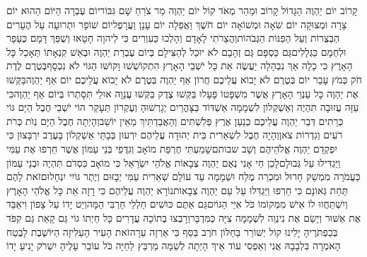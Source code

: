 \documentclass[../main/main.tex]{subfiles}
\begin{document}
\begin{multicols*}{\ncols}
\PreVerseSpace{}קָרוֹב יוֹם יַהְוֶה הַגָּדוֹל קָרוֹב וּמַהֵר מְאֹד קוֹל יוֹם יַהְוֶה מַר צֹרֵחַ שָׁם גִּבּוֹר\PreVerseSpace{}יוֹם עֶבְרָה הַיּוֹם הַהוּא יוֹם צָרָה וּמְצוּקָה יוֹם שֹׁאָה וּמְשׁוֹאָה יוֹם חֹשֶׁךְ וַאֲפֵלָה יוֹם עָנָן וַעֲרָפֶל\PreVerseSpace{}יוֹם שׁוֹפָר וּתְרוּעָה עַל הֶעָרִים הַבְּצֻרוֹת וְעַל הַפִּנּוֹת הַגְּבֹהוֹת\PreVerseSpace{}וַהֲצֵרֹתִי לָאָדָם וְהָלְכוּ כַּעִוְרִים כִּי לַיהוָה חָטָאוּ וְשֻׁפַּךְ דָּמָם כֶּעָפָר וּלְחֻמָם כַּגְּלָלִים\PreVerseSpace{}גַּם כַּסְפָּם גַּם זְהָבָם לֹא יוּכַל לְהַצִּילָם בְּיוֹם עֶבְרַת יַהְוֶה וּבְאֵשׁ קִנְאָתוֹ תֵּאָכֵל כָּל הָאָרֶץ כִּי כָלָה אַךְ נִבְהָלָה יַעֲשֶׂה אֵת כָּל יֹשְׁבֵי הָאָרֶץ \ClosedSection{}הִתְקוֹשְׁשׁוּ וָקוֹשּׁוּ הַגּוֹי לֹא נִכְסָף\PreVerseSpace{}בְּטֶרֶם לֶדֶת חֹק כְּמֹץ עָבַר יוֹם בְּטֶרֶם לֹא יָבוֹא עֲלֵיכֶם חֲרוֹן אַף יַהְוֶה בְּטֶרֶם לֹא יָבוֹא עֲלֵיכֶם יוֹם אַף יַהְוֶה\PreVerseSpace{}בַּקְּשׁוּ אֶת יַהְוֶה כָּל עַנְוֵי הָאָרֶץ אֲשֶׁר מִשְׁפָּטוֹ פָּעָלוּ בַּקְּשׁוּ צֶדֶק בַּקְּשׁוּ עֲנָוָה אוּלַי תִּסָּתְרוּ בְּיוֹם אַף יַהְוֶה\PreVerseSpace{}כִּי עַזָּה עֲזוּבָה תִהְיֶה וְאַשְׁקְלוֹן לִשְׁמָמָה אַשְׁדּוֹד בַּצָּהֳרַיִם יְגָרְשׁוּהָ וְעֶקְרוֹן תֵּעָקֵר \ClosedSection{}הוֹי יֹשְׁבֵי חֶבֶל הַיָּם גּוֹי כְּרֵתִים דְּבַר יַהְוֶה עֲלֵיכֶם כְּנַעַן אֶרֶץ פְּלִשְׁתִּים וְהַאֲבַדְתִּיךְ מֵאֵין יוֹשֵׁב\PreVerseSpace{}וְהָיְתָה חֶבֶל הַיָּם נְוֺת כְּרֹת רֹעִים וְגִדְרוֹת צֹאן\PreVerseSpace{}וְהָיָה חֶבֶל לִשְׁאֵרִית בֵּית יְהוּדָה עֲלֵיהֶם יִרְעוּן בְּבָתֵּי אַשְׁקְלוֹן בָּעֶרֶב יִרְבָּצוּן כִּי יִפְקְדֵם יַהְוֶה אֱלֹהֵיהֶם וְשָׁב שבותם\PreVerseSpace{}שָׁמַעְתִּי חֶרְפַּת מוֹאָב וְגִדֻּפֵי בְּנֵי עַמּוֹן אֲשֶׁר חֵרְפוּ אֶת עַמִּי וַיַּגְדִּילוּ עַל גְּבוּלָם\PreVerseSpace{}לָכֵן חַי אָנִי נְאֻם יַהְוֶה צְבָאוֹת אֱלֹהֵי יִשְׂרָאֵל כִּי מוֹאָב כִּסְדֹם תִּהְיֶה וּבְנֵי עַמּוֹן כַּעֲמֹרָה מִמְשַׁק חָרוּל וּמִכְרֵה מֶלַח וּשְׁמָמָה עַד עוֹלָם שְׁאֵרִית עַמִּי יְבָזּוּם וְיֶתֶר גּוֹיִי\SubEnd{} יִנְחָלוּם\PreVerseSpace{}זֹאת לָהֶם תַּחַת גְּאוֹנָם כִּי חֵרְפוּ וַיַּגְדִּלוּ עַל עַם יַהְוֶה צְבָאוֹת\PreVerseSpace{}נוֹרָא יַהְוֶה עֲלֵיהֶם כִּי רָזָה אֵת כָּל אֱלֹהֵי הָאָרֶץ וְיִשְׁתַּחֲווּ לוֹ אִישׁ מִמְּקוֹמוֹ כֹּל אִיֵּי הַגּוֹיִם\PreVerseSpace{}גַּם אַתֶּם כּוּשִׁים חַלְלֵי חַרְבִּי הֵמָּה\PreVerseSpace{}וְיֵט יָדוֹ עַל צָפוֹן וִיאַבֵּד אֶת אַשּׁוּר וְיָשֵׂם אֶת נִינְוֵה לִשְׁמָמָה צִיָּה כַּמִּדְבָּר\PreVerseSpace{}וְרָבְצוּ בְתוֹכָהּ עֲדָרִים כָּל חַיְתוֹ גוֹי גַּם קָאַת גַּם קִפֹּד בְּכַפְתֹּרֶיהָ יָלִינוּ קוֹל יְשׁוֹרֵר בַּחַלּוֹן חֹרֶב בַּסַּף כִּי אַרְזָה עֵרָה\PreVerseSpace{}זֹאת הָעִיר הָעַלִּיזָה הַיּוֹשֶׁבֶת לָבֶטַח הָאֹמְרָה בִּלְבָבָהּ אֲנִי וְאַפְסִי עוֹד אֵיךְ הָיְתָה לְשַׁמָּה מַרְבֵּץ לַחַיָּה כֹּל עוֹבֵר עָלֶיהָ יִשְׁרֹק יָנִיעַ יָדוֹ\OpenSection{}\par

\end{multicols*}
\end{document}
